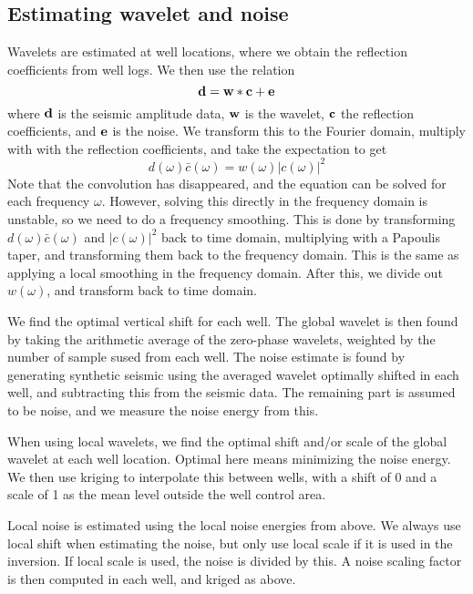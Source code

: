 \subsection{Estimating wavelet and noise}
\label{sec:waveestimp}
Wavelets are estimated at well locations, where we obtain the reflection coefficients from well logs. We then use the relation
\begin{equation}
\mathbf{d} = \mathbf{w}*\mathbf{c}+\mathbf{e}
\end{equation}
where $\mathbf{d}$ is the seismic amplitude data, $\mathbf{w}$ is the wavelet, $\mathbf{c}$ the reflection coefficients, and $\mathbf{e}$ is the noise. We transform this to the Fourier domain, multiply with with the reflection coefficients, and take the expectation to get
\begin{equation}
d(\omega)\bar{c}(\omega) = w(\omega)|c(\omega)|^2
\end{equation}
Note that the convolution has disappeared, and the equation can be solved for each frequency $\omega$. However, solving this directly in the frequency domain is unstable, so we need to do a frequency smoothing. This is done by transforming $d(\omega)\bar{c}(\omega)$ and $|c(\omega)|^2$ back to time domain, multiplying with a Papoulis taper, and transforming them back to the frequency domain. This is the same as applying a local smoothing in the frequency domain. After this, we divide out $w(\omega)$, and transform back to time domain.

We find the optimal vertical shift for each well. The global wavelet is then found by taking the arithmetic average of the zero-phase wavelets, weighted by the number of sample sused from each well. The noise estimate is found by generating synthetic seismic using the averaged wavelet optimally shifted in each well, and subtracting this from the seismic data. The remaining part is assumed to be noise, and we measure the noise energy from this.

When using local wavelets, we find the optimal shift and/or scale of the global wavelet at each well location. Optimal here means minimizing the noise energy. We then use kriging to interpolate this between wells, with a shift of 0 and a scale of 1 as the mean level outside the well control area.

Local noise is estimated using the local noise energies from above. We always use local shift when estimating the noise, but only use local scale if it is used in the inversion. If local scale is used, the noise is divided by this. A noise scaling factor is then computed in each well, and kriged as above.

